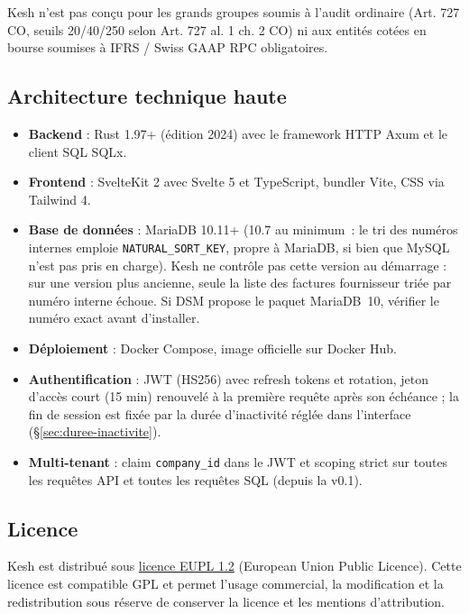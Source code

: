 \documentclass[a4paper,11pt,oneside]{article}
\begin{document}
Kesh n'est pas conçu pour les grands groupes soumis à l'audit ordinaire (Art. 727 CO, seuils 20/40/250 selon Art. 727 al. 1 ch. 2 CO) ni aux entités cotées en bourse soumises à IFRS / Swiss GAAP RPC obligatoires.

\subsection{Architecture technique haute}

\begin{itemize}
    \item \textbf{Backend} : Rust 1.97+ (édition 2024) avec le framework HTTP Axum et le client SQL SQLx.
    \item \textbf{Frontend} : SvelteKit 2 avec Svelte 5 et TypeScript, bundler Vite, CSS via Tailwind 4.
    \item \textbf{Base de données} : MariaDB 10.11+ (10.7 au minimum~: le tri des numéros internes emploie \texttt{NATURAL\_SORT\_KEY}, propre à MariaDB, si bien que MySQL n'est pas pris en charge). Kesh ne contrôle pas cette version au démarrage : sur une version plus ancienne, seule la liste des factures fournisseur triée par numéro interne échoue. Si DSM propose le paquet MariaDB~10, vérifier le numéro exact avant d'installer.
    \item \textbf{Déploiement} : Docker Compose, image officielle  sur Docker Hub.
    \item \textbf{Authentification} : JWT (HS256) avec refresh tokens et rotation, jeton d'accès court (15 min) renouvelé à la première requête après son échéance ; la fin de session est fixée par la durée d'inactivité réglée dans l'interface (\S\ref{sec:duree-inactivite}).
    \item \textbf{Multi-tenant} : claim \texttt{company\_id} dans le JWT et scoping strict sur toutes les requêtes API et toutes les requêtes SQL (depuis la v0.1).
\end{itemize}

\subsection{Licence}

Kesh est distribué sous \href{https://joinup.ec.europa.eu/collection/eupl/eupl-text-eupl-12}{licence EUPL 1.2} (European Union Public Licence). Cette licence est compatible GPL et permet l'usage commercial, la modification et la redistribution sous réserve de conserver la licence et les mentions d'attribution.
\end{document}
